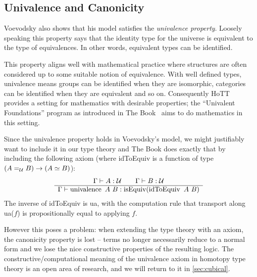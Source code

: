 \subsection{Univalence and Canonicity}%
Voevodsky also shows that his model satisfies the \emph{univalence property}.
Loosely speaking this property says that the identity type for the universe is
equivalent to the type of equivalences. In other words, equivalent types can be
identified.

This property aligns well with mathematical practice where structures are often
considered up to some suitable notion of equivalence. With well defined types,
univalence means groups can be identified when they are isomorphic, categories
can be identified when they are equivalent and so on.
Consequently HoTT provides a setting for mathematics with desirable properties; the ``Univalent
Foundations'' program as introduced in The Book~\cite{hottbook} aims to do
mathematics in this setting.

Since the univalence property holds in Voevodsky's model, we might justifiably want to
include it in our type theory and The Book does exactly that by including the following
axiom (where idToEquiv is a function of type $(A =_{\mathcal{U}} B) \rightarrow (A
\simeq B)$):
\begin{equation*}
  \begin{array}[t]{c}
    \Gamma \vdash A : \mathcal{U} \qquad \Gamma \vdash B : \mathcal{U}\\
    \hline
    \Gamma \vdash \operatorname{univalence}~A~B : \operatorname{isEquiv} (\operatorname{idToEquiv}~A~B)
  \end{array}
\end{equation*}
The inverse of idToEquiv is ua, with the computation rule that transport along
ua($f$) is propositionally equal to applying $f$.

However this poses a problem: when extending the
type theory with an axiom, the canonicity property is lost -- terms no longer
necessarily reduce to a normal form and we lose the nice constructive properties
of the resulting logic. The constructive/computational meaning of the univalence
axiom in homotopy type theory is an open area of research, and we will return to
it in \autoref{sec:cubical}.